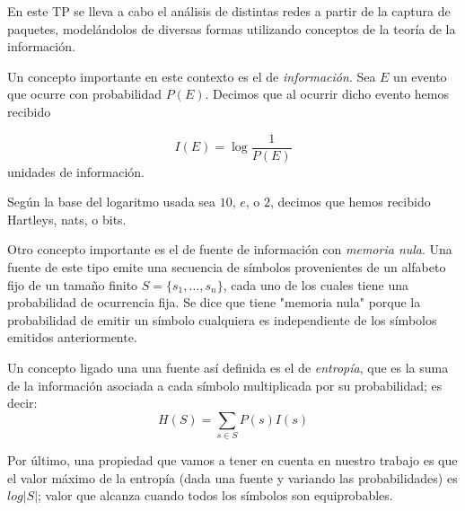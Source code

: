 En este TP se lleva a cabo el análisis de distintas redes a partir de
la captura de paquetes, modelándolos de diversas formas utilizando
conceptos de la teoría de la información.
 
Un concepto importante en este contexto es el de \textit{información}. Sea $E$
un evento que ocurre con probabilidad $P(E)$. Decimos que al ocurrir
dicho evento hemos recibido

$$
I(E) = \log{\frac{1}{P(E)}}
$$
unidades de información.
 
Según la base del logaritmo usada sea $10$, $e$, o $2$, decimos que
hemos recibido Hartleys, nats, o bits.
 
Otro concepto importante es el de fuente de información con 
\textit{memoria nula}.
Una fuente de este tipo emite una secuencia de símbolos
provenientes de un alfabeto fijo de un tamaño finito $S
= \{s_1, \dots, s_n\}$, cada uno de los cuales tiene una probabilidad
de ocurrencia fija. Se dice que tiene "memoria nula" porque la
probabilidad de emitir un símbolo cualquiera es independiente de los
símbolos emitidos anteriormente.

Un concepto ligado una una fuente así definida es el de \textit{entropía}, que
es la suma de la información asociada a cada símbolo multiplicada por
su probabilidad; es decir:
$$
H(S) = \sum_{s \in S} P(s)I(s)
$$

Por último, una propiedad que vamos a tener en cuenta en nuestro
trabajo es que el valor máximo de la entropía (dada una fuente y
variando las probabilidades) es $log |S|$; valor que
alcanza cuando todos los símbolos son equiprobables.
